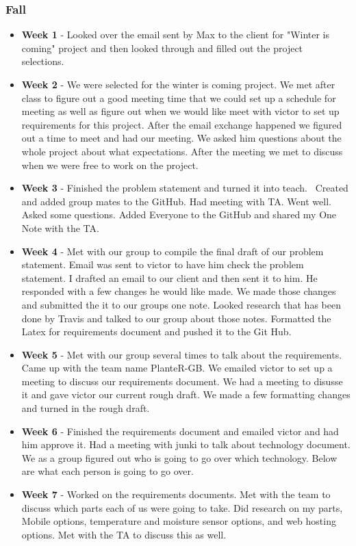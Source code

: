 \documentclass[onecolumn, draftclsnofoot,10pt, compsoc]{IEEEtran}
\begin{document}
			\subsubsection{Fall}
				\begin{itemize}
					\item \textbf{Week 1} - Looked over the email sent by Max to the client for "Winter is coming" project and then looked through and filled out the project selections. 
					\item \textbf{Week 2} -  We were selected for the winter is coming project. We met after class to figure out a good meeting time that we could set up a schedule for meeting as well as figure out when we would like meet with victor to set up requirements for this project. After the email exchange happened we figured out  a time to meet and had our meeting. We asked him questions about the whole project about what expectations. After the meeting we met to discuss when we were free to work on the project.
					\item \textbf{Week 3} - Finished the problem statement and turned it into teach.  Created and added group mates to the GitHub. Had meeting with TA. Went well. Asked some questions. Added Everyone to the GitHub and shared my One Note with the TA.
					\item \textbf{Week 4} - Met with our group to compile the final draft of our problem statement.  Email was sent to victor to have him check the problem statement.  I drafted an email to our client and then sent it to him. He responded with a few changes he would like made. We made those changes and submitted the it to our groups one note.  Looked research that has been done by Travis and talked to our group about those notes. Formatted the Latex for requirements document and pushed it to the Git Hub.
					\item \textbf{Week 5} - Met with our group several times to talk about the requirements. Came up with the team name PlanteR-GB. We emailed victor to set up a meeting to discuss our requirements document. We had a meeting to disusse it and gave victor our current rough draft.  We made a few formatting changes and turned in the rough draft.
					\item \textbf{Week 6} - Finished the requirements document and emailed victor and had him approve it. Had a meeting with junki to talk about technology document. We as a group figured out who is going to go over which technology.  Below are what each person is going to go over.
					\item \textbf{Week 7} - Worked on the requirements documents. Met with the team to discuss which parts each of us were going to take. Did research on my parts, Mobile options, temperature and moisture sensor options, and web hosting options.  Met with the TA to discuss this as well.

\end{itemize}
\end{document}
